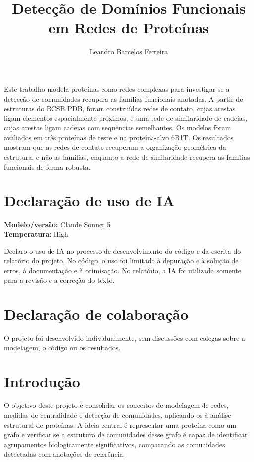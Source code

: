 \documentclass[12pt]{article}
\title{Detecção de Domínios Funcionais em Redes de Proteínas}
\author{Leandro Barcelos Ferreira\inst{1}}
\begin{document}
	\maketitle

	\begin{resumo}
		Este trabalho modela proteínas como redes complexas para investigar se a detecção de comunidades recupera as famílias funcionais anotadas. A partir de estruturas do RCSB PDB, foram construídas redes de contato, cujas arestas ligam elementos espacialmente próximos, e uma rede de similaridade de cadeias, cujas arestas ligam cadeias com sequências semelhantes. Os modelos foram avaliados em três proteínas de teste e na proteína-alvo 6B1T. Os resultados mostram que as redes de contato recuperam a organização geométrica da estrutura, e não as famílias, enquanto a rede de similaridade recupera as famílias funcionais de forma robusta.
	\end{resumo}

	\section*{Declaração de uso de IA}

	\noindent\textbf{Modelo/versão:} Claude Sonnet 5 \\
	\textbf{Temperatura:} High

	\vspace{0.5em}
	\noindent Declaro o uso de IA no processo de desenvolvimento do código e da escrita do relatório do projeto. No código, o uso foi limitado à depuração e à solução de erros, à documentação e à otimização. No relatório, a IA foi utilizada somente para a revisão e a correção do texto.

	\section*{Declaração de colaboração}

	\noindent O projeto foi desenvolvido individualmente, sem discussões com colegas sobre a modelagem, o código ou os resultados.

	\section{Introdução}
	\label{sec_introducao}

	O objetivo deste projeto é consolidar os conceitos de modelagem de redes, medidas de centralidade e detecção de comunidades, aplicando-os à análise estrutural de proteínas. A ideia central é representar uma proteína como um grafo e verificar se a estrutura de comunidades desse grafo é capaz de identificar agrupamentos biologicamente significativos, comparando as comunidades detectadas com anotações de referência.
\end{document}
